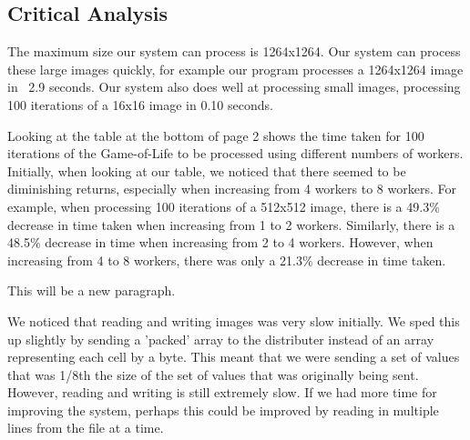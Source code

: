 \documentclass{article}
\begin{document}
\begin{multicols}{2}

\section{Critical Analysis}
The maximum size our system can process is 1264x1264. Our system can process these large
images quickly, for example our program processes a 1264x1264 image in ~2.9 seconds. Our system
also does well at processing small images, processing 100 iterations of a 16x16 image in 0.10
seconds.

\vspace{3mm}

Looking at the table at the bottom of page 2 shows the time taken for
100 iterations of the Game-of-Life to be processed using different numbers of workers. Initially,
when looking at our table, we noticed that there seemed to be diminishing returns, especially when
increasing from 4 workers to 8 workers. For example, when processing 100 iterations of a 512x512
image, there is a 49.3\% decrease in time taken when increasing from 1 to 2 workers. Similarly,
there is a 48.5\% decrease in time when increasing from 2 to 4 workers. However, when increasing
from 4 to 8 workers, there was only a 21.3\% decrease in time taken.

\vspace{3mm}

This will be a new paragraph.


\vspace{3mm}

We noticed that reading and writing images was very slow initially. We sped this up slightly by
sending a 'packed' array to the distributer instead of an array representing each cell by a byte.
This meant that we were sending a set of values that was 1/8th the size of the set of values that
was originally being sent. However, reading and writing is still extremely slow. If we had
more time for improving the system, perhaps this could be improved by reading in multiple lines
from the file at a time.



\end{multicols}

\end{document}
